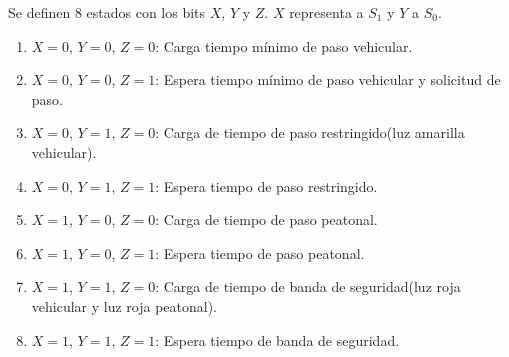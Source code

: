 %
%
%

Se definen 8 estados con los bits $X$, $Y$ y $Z$. $X$ representa a $S_1$ y $Y$ a $S_0$.
\begin{enumerate}[label*=\textbf{\alph*)}]
  \item $X=0$, $Y=0$, $Z=0$: Carga tiempo mínimo de paso vehicular.
  \item $X=0$, $Y=0$, $Z=1$: Espera tiempo mínimo de paso vehicular y solicitud de paso.
  \item $X=0$, $Y=1$, $Z=0$: Carga de tiempo de paso restringido(luz amarilla vehicular).
  \item $X=0$, $Y=1$, $Z=1$: Espera tiempo de paso restringido.
  \item $X=1$, $Y=0$, $Z=0$: Carga de tiempo de paso peatonal.
  \item $X=1$, $Y=0$, $Z=1$: Espera tiempo de paso peatonal.
  \item $X=1$, $Y=1$, $Z=0$: Carga de tiempo de banda de seguridad(luz roja vehicular y luz roja peatonal).
  \item $X=1$, $Y=1$, $Z=1$: Espera tiempo de banda de seguridad.
\end{enumerate}
